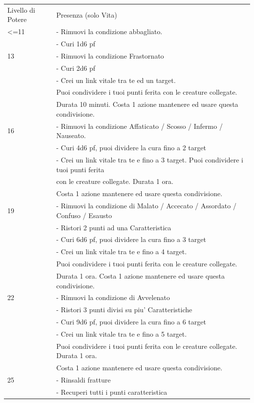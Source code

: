 \documentclass[a4paper,11pt,twoside,openany]{dndbook}
\begin{document}
\begin{tabular}[c]{@{}ll@{}}
	\toprule 
Livello di Potere & Presenza (solo Vita)\tabularnewline	
<=11 & - Rimuovi la condizione abbagliato.
\\
& - Curi 1d6 pf
\\
13 & - Rimuovi la condizione Frastornato
\\
& - Curi 2d6 pf
\\
& - Crei un link vitale tra te ed un target.\\
& Puoi condividere i tuoi punti ferita
con le creature collegate.\\
& Durata 10 minuti. Costa 1 azione mantenere ed
usare questa condivisione.
 \\
16 & - Rimuovi la condizione Affaticato / Scosso / Infermo / Nauseato.
\\
& - Curi 4d6 pf, puoi dividere la cura fino a 2 target
\\
& - Crei un link vitale tra te e fino a 3 target. Puoi condividere i tuoi punti ferita\\
& con le creature collegate. Durata 1 ora.\\
& Costa 1 azione mantenere ed usare questa condivisione.\\
19 & - Rimuovi la condizione di Malato / Accecato / Assordato / Confuso / Esausto\\
& - Ristori 2 punti ad una Caratteristica\\
& - Curi 6d6 pf, puoi dividere la cura fino a 3 target\\
& - Crei un link vitale tra te e fino a 4 target.\\
& Puoi condividere i tuoi punti ferita
con le creature collegate.\\
& Durata 1 ora. Costa 1 azione mantenere ed usare
questa condivisione.
\\
22 &- Rimuovi la condizione di Avvelenato
\\
& - Ristori 3 punti divisi su piu' Caratteristiche
\\
& - Curi 9d6 pf, puoi dividere la cura fino a 6 target
\\
&- Crei un link vitale tra te e fino a 5 target.\\
& Puoi condividere i tuoi punti ferita
con le creature collegate. Durata 1 ora.\\
& Costa 1 azione mantenere ed usare
questa condivisione.
\\
25 & - Rinsaldi fratture
\\
& - Recuperi tutti i punti caratteristica
\\

\end{tabular}
\end{document}
